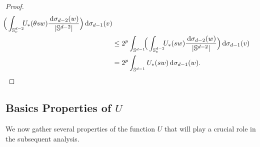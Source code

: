 \documentclass[12pt, reqno]{amsart}%
\theoremstyle{plain}  %
\theoremstyle{definition}  %
\theoremstyle{remark}
\numberwithin{equation}{section}
\renewcommand{\d}{\,\mathrm{d}}
\begin{document}
\begin{proof}
\begin{align*}
\hspace*{-1ex}\Big(
\int_{\mathbb{S}^{d-2}_v} \hspace*{-1ex} U_*(\theta sw) \frac{\d\sigma_{d-2}(w)}{|\mathbb{S}^{d-2}|}
\Big)
\d\sigma_{d-1}(v)\\
&\leq 2^{p} \int_{\mathbb{S}^{d-1}}
\hspace*{-1ex}\Big(\int_{\mathbb{S}^{d-2}_v} \hspace*{-1ex}U_*(sw) \frac{\d\sigma_{d-2}(w)}{|\mathbb{S}^{d-2}|}
\Big) \d\sigma_{d-1}(v)\\
&= 2^{p}\int_{\mathbb{S}^{d-1}} U_*(sw)
\d \sigma_{d-1}(w).
\end{align*}
\end{proof}


\subsection{Basics Properties of $U$} We now gather several properties of the function
$U$ that will play a crucial role in the subsequent analysis.
\end{document}
